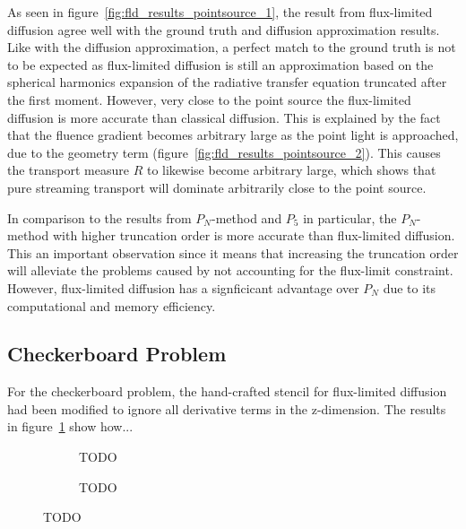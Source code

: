 
As seen in figure~\ref{fig:fld_results_pointsource_1}, the result from flux-limited diffusion agree well with the ground truth and diffusion approximation results. Like with the diffusion approximation, a perfect match to the ground truth is not to be expected as flux-limited diffusion is still an approximation based on the spherical harmonics expansion of the radiative transfer equation truncated after the first moment. However, very close to the point source the flux-limited diffusion is more accurate than classical diffusion. This is explained by the fact that the fluence gradient becomes arbitrary large as the point light is approached, due to the geometry term (figure~\ref{fig:fld_results_pointsource_2}). This causes the transport measure $R$ to likewise become arbitrary large, which shows that pure streaming transport will dominate arbitrarily close to the point source.

In comparison to the results from $P_N$-method and $P_5$ in particular, the $P_N$-method with higher truncation order is more accurate than flux-limited diffusion. This an important observation since it means that increasing the truncation order will alleviate the problems caused by not accounting for the flux-limit constraint. However, flux-limited diffusion has a signficicant advantage over $P_N$ due to its computational and memory efficiency.

\subsection{Checkerboard Problem}
\label{sec:pn_results_checkerboard}

For the checkerboard problem, the hand-crafted stencil for flux-limited diffusion had been modified to ignore all derivative terms in the z-dimension. The results in figure~\ref{fig:fld_results_checkerboard_1} show how...
\begin{figure}[h]
\centering
\begin{subfigure}{0.49\columnwidth}
\caption{TODO}
\label{fig:fld_results_checkerboard_1}
\end{subfigure}%
\hspace{0.01\columnwidth}
\begin{subfigure}{0.49\columnwidth}
\caption{TODO}
\label{fig:fld_results_checkerboard_2}
\end{subfigure}%
\caption{TODO}
\label{fig:fld_results_checkerboard}
\end{figure}

